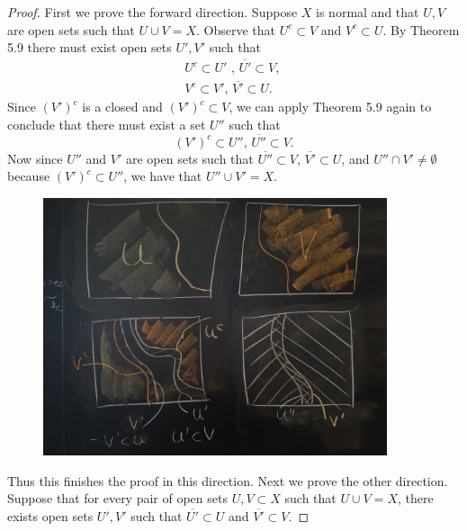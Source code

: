 \documentclass[a4paper,12pt,twoside]{hmcpset}
\begin{document}
\begin{proof}
    First we prove the forward direction. Suppose $X$ is normal
    and that $U, V$ are open sets such that $U \cup V = X$. Observe that
    $U^c \subset V$ and $V^c \subset U$. By Theorem 5.9
    there must exist open sets $U', V'$ such
    that 
    \vspace{-6mm}
    \begin{gather*}
    U^c \subset U' 
    \text{ , } \overline{U'} \subset V
     \text{, }\\ 
     V^c \subset V' \text{, } \overline{V'}
    \subset U.
    \end{gather*}
    Since $(V')^c$ is a closed and 
    $(V')^c \subset V$, we can apply Theorem 5.9 again to conclude that
    there must exist a set $U''$ such that 
    $$
    (V')^c \subset U'' \text{, } \overline{U''} \subset V.
    $$
    Now since $U''$ and $V'$ are open sets such that
    $\overline{U''} \subset V$, $\overline{V'} \subset U$, and $U''
    \cap V' \ne \emptyset$ because $(V')^c \subset U''$, we have that
    $U'' \cup V' = X$. 
    \begin{figure}[h!!]
        \centering
        \includegraphics[width = 0.9\textwidth]{sketch_them_5_11.jpg}
    \end{figure}
    \newpage
    \noindent
Thus this finishes the proof in this direction.
Next we prove the other direction. Suppose that for every pair of
open sets $U, V \subset X$ such that $U \cup V = X$, there exists open
sets $U', V'$ such that $\overline{U'}\subset U$ and $\overline{V'}
\subset V$. 

\end{proof}
\end{document}
